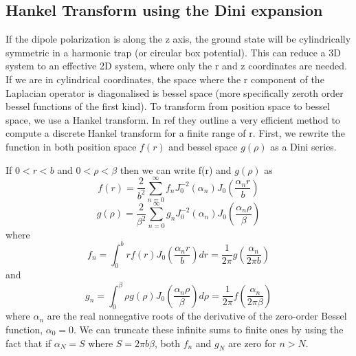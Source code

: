 \documentclass[10pt]{article}
\numberwithin{equation}{section}
\begin{document}
\begin{multicols}{2}
\section{Hankel Transform using the Dini expansion}
If the dipole polarization is along the z axis, the ground state will be cylindrically symmetric in a harmonic trap (or circular box potential). This can reduce a 3D system to an effective 2D system, where only the r and z coordinates are needed. If we are in cylindrical coordinates, the space where the r component of the Laplacian operator is diagonalised is bessel space (more specifically zeroth order bessel functions of the first kind). To transform from position space to bessel space, we use a Hankel transform. In ref \cite{Kai_Ming_2009} they outline a very efficient method to compute a discrete Hankel transform for a finite range of r. 
First, we rewrite the function in both position space $f(r)$ and bessel space $g(\rho)$ as a Dini series. 



If $0<r<b$ and $0<\rho<\beta$ then we can write f(r) and $g(\rho)$ as
\begin{equation}
f(r) = \frac{2}{b^{2}}\sum_{n=0}^{\infty}f_{n}J_{0}^{-2}(\alpha_{n})J_{0}(\frac{\alpha_{n}r}{b})
\end{equation}
\begin{equation}
g(\rho) = \frac{2}{\beta^{2}}\sum_{n=0}^{\infty}g_{n}J_{0}^{-2}(\alpha_{n})J_{0}(\frac{\alpha_{n}\rho}{\beta})
\end{equation}
where 
\begin{equation}
f_{n} = \int_{0}^{b}rf(r)J_{0}(\frac{\alpha_{n}r}{b})dr=\frac{1}{2\pi}g(\frac{\alpha_{n}}{2\pi b})
\end{equation}
and
\begin{equation}
g_{n} = \int_{0}^{\beta}\rho g(\rho)J_{0}(\frac{\alpha_{n}\rho}{\beta})d\rho=\frac{1}{2\pi}f(\frac{\alpha_{n}}{2\pi\beta})
\end{equation}
where $\alpha_{n}$ are the real nonnegative roots of the derivative of the zero-order Bessel function, $\alpha_{0}=0$. We can truncate these infinite sums to finite ones by using the fact that if $\alpha_{N} =S$ where $S=2\pi b\beta$, both $f_{n}$ and $g_{N}$ are zero for $n>N$.


\end{multicols}
\end{document}
